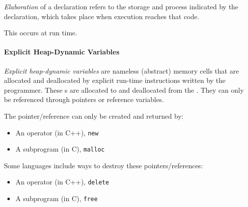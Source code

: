\begin{definition}[Elaboration]\label{def:Variable_Storage_Binding_Elaboration}
  \emph{Elaboration} of a  declaration refers to the storage  and  process indicated by the declaration, which takes place when execution reaches that code.

  This occurs at run time.
\end{definition}

\paragraph{Explicit Heap-Dynamic Variables}\label{par:Explicit_Heap-Dynamic_Variable_Binding_Lifetime}
\begin{definition}\label{def:Explicit_Heap-Dynamic_Variable_Binding_Lifetime}
  \emph{Explicit heap-dynamic variables} are nameless (abstract) memory cells that are allocated and deallocated by explicit run-time instructions written by the programmer.
  These s are allocated to and deallocated from the .
  They can only be referenced through pointers or reference variables.

  The pointer/reference can only be created and returned by:
  \begin{itemize}[noitemsep]
  \item An operator (in C++), \texttt{new}
  \item A subprogram (in C), \texttt{malloc}
  \end{itemize}

  Some languages include ways to destroy these pointers/references:
  \begin{itemize}[noitemsep]
  \item An operator (in C++), \texttt{delete}
  \item A subprogram (in C), \texttt{free}
  \end{itemize}


\end{definition}
